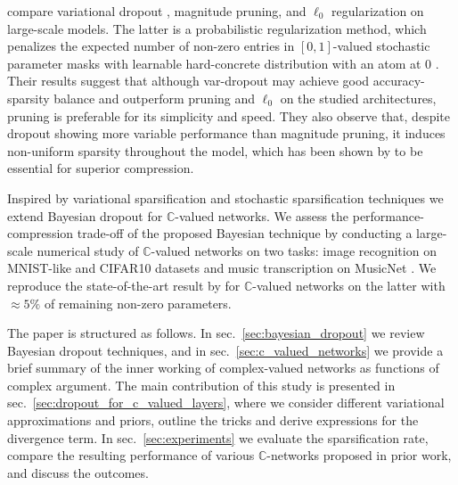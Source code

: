 \documentclass[a4paper,10pt]{article}
\newcommand{\cplx}{\mathbb{C}}
\begin{document}
\citet{gale_state_2019} compare variational dropout \citep{kingma_variational_2015},
magnitude pruning, and $\ell_0$ regularization \citep{louizos_learning_2017} on large-scale
models. The latter is a probabilistic regularization method, which penalizes the expected
number of non-zero entries in $[0, 1]$-valued stochastic parameter masks with learnable
hard-concrete distribution with an atom at $0$ \citep{maddison_concrete_2016,jang_categorical_2017}.
Their results suggest that although var-dropout may achieve good accuracy-sparsity balance
and outperform pruning and $\ell_0$ on the studied architectures, pruning is preferable for
its simplicity and speed. They also observe that, despite dropout showing more variable
performance than magnitude pruning, it induces non-uniform sparsity throughout the model,
which has been shown by \citet{he_amc:_2018} to be essential for superior compression.
%
%

Inspired by variational sparsification and stochastic sparsification techniques we
extend Bayesian dropout for $\cplx$-valued networks. We assess the performance-compression
trade-off of the proposed Bayesian technique by conducting a large-scale numerical study
of $\cplx$-valued networks on two tasks: image recognition on MNIST-like and CIFAR10 datasets
and music transcription on MusicNet \citep{thickstun_learning_2017}. We reproduce the
state-of-the-art result by \citet{trabelsi_deep_2017} for $\cplx$-valued networks on the
latter with $\approx 5\%$ of remaining non-zero parameters.

The paper is structured as follows. In sec.~\ref{sec:bayesian_dropout} we review Bayesian
dropout techniques, and in sec.~\ref{sec:c_valued_networks} we provide a brief summary of
the inner working of complex-valued networks as functions of complex argument. The main
contribution of this study is presented in sec.~\ref{sec:dropout_for_c_valued_layers},
where we consider different variational approximations and priors, outline the tricks
and derive expressions for the divergence term. In sec.~\ref{sec:experiments} we evaluate
the sparsification rate, compare the resulting performance of various $\cplx$-networks
proposed in prior work, and discuss the outcomes.
\end{document}

